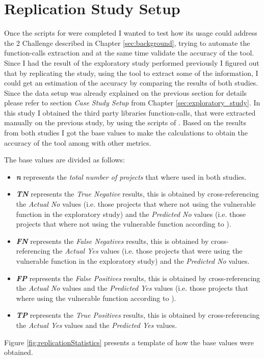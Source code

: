 \section{Replication Study Setup}
Once the scripts for \tool[] were completed I wanted to test how its usage could address the 2 Challenge described in Chapter \ref{sec:background}, trying to automate the function-calls extraction and at the same time validate the accuracy of the tool. 
Since I had the result of the exploratory study performed previously I figured out that by replicating the study, using the tool to extract some of the information, I could get an estimation of the accuracy by comparing the results of both studies.
Since the data setup was already explained on the previous section for details please refer to section \textit{Case Study Setup} from Chapter \ref{sec:exploratory_study}.
In this study I obtained the third party libraries function-calls, that were extracted manually on the previous study, by using the scripts of \tool[]. Based on the results from both studies I got the base values to make the calculations to obtain the accuracy of the tool among with other metrics. 

The base values are divided as follows:
\begin{itemize}
    \item \textbf{\textit{n}} represents the \textit{total number of projects} that where used in both studies.
    \item \textbf{\textit{TN}} represents the \textit{True Negative} results, this is obtained by cross-referencing the \textit{Actual No} values (i.e. those projects that where not using the vulnerable function in the exploratory study) and the \textit{Predicted No} values (i.e. those projects that where not using the vulnerable function according to \tool[]). 
    \item \textbf{\textit{FN}} represents the \textit{False Negatives} results, this is obtained by cross-referencing the \textit{Actual Yes} values (i.e. those projects that were using the vulnerable function in the exploratory study) and the \textit{Predicted No} values. 
    \item \textbf{\textit{FP}} represents the \textit{False Positives} results, this is obtained by cross-referencing the \textit{Actual No} values and the \textit{Predicted Yes} values (i.e. those projects that where using the vulnerable function according to \tool[]).
    \item \textbf{\textit{TP}} represents the \textit{True Positives} results, this is obtained by cross-referencing the \textit{Actual Yes} values and the \textit{Predicted Yes} values.
\end{itemize}
Figure \ref{fig:replicationStatistics} presents a template of how the base values were obtained.

